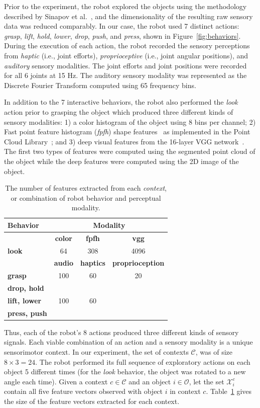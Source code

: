Prior to the experiment, the robot explored the objects using the methodology described by Sinapov et al.~, and the dimensionality of the resulting raw sensory data was reduced comparably.
In our case, the robot used 7 distinct actions: {\it grasp}, {\it lift}, {\it hold}, {\it lower}, {\it drop}, {\it push}, and {\it press}, shown in Figure~\ref{fig:behaviors}.
During the execution of each action, the robot recorded the sensory perceptions from {\it haptic} (i.e., joint efforts), {\it proprioceptive} (i.e., joint angular positions), and {\it auditory} sensory modalities.
The joint efforts and joint positions were recorded for all 6 joints at 15 Hz.
The auditory sensory modality was represented as the Discrete Fourier Transform computed using 65 frequency bins.

In addition to the 7 interactive behaviors, the robot also performed the {\it look} action prior to grasping the object which produced three different kinds of sensory modalities: 1) a color histogram of the object using 8 bins per channel; 2) Fast point feature histogram ({\it fpfh}) shape features~\cite{rusu:icra09} as implemented in the Point Cloud Library~\cite{aldoma:ram12}; and 3) deep visual features from the 16-layer VGG network~\cite{simonyan:corr14}.
The first two types of features were computed using the segmented point cloud of the object while the deep features were computed using the 2D image of the object. 

\begin{table}
\centering
\begin{tabular}[h]{|l|c|c|c|}
	\hline
	\bf Behavior & \multicolumn{3}{c|}{\bf Modality} \\ \hline \hline
	& \bf color & \bf fpfh & \bf vgg \\ \hline
	\bf look & 64 & 308 & 4096 \\ \hline \hline
	& \bf audio & \bf haptics & \bf proprioception \\ \hline
	\bf grasp & 100 & 60 & 20 \\ \hline
	\bf drop, hold & & & \\
	\bf lift, lower & 100 & 60 & \\
	\bf press, push & & & \\ \hline
\end{tabular}
\caption{The number of features extracted from each \textit{context}, or combination of robot behavior and perceptual modality.}
\label{tab:feature_space_of_contexts}
\end{table}

Thus, each of the robot's 8 actions produced three different kinds of sensory signals.
Each viable combination of an action and a sensory modality is a unique sensorimotor context.
In our experiment, the set of contexts $\mathcal{C}$, was of size  $8 \times 3 = 24$.
The robot performed its full sequence of exploratory actions on each object 5 different times (for the {\it look} behavior, the object was rotated to a new angle each time). Given a context $c \in \mathcal{C}$ and an object $i \in \mathcal{O}$, let the set $\mathcal{X}_i^c$ contain all five feature vectors observed with object $i$ in context $c$.
Table~\ref{tab:feature_space_of_contexts} gives the size of the feature vectors extracted for each context.